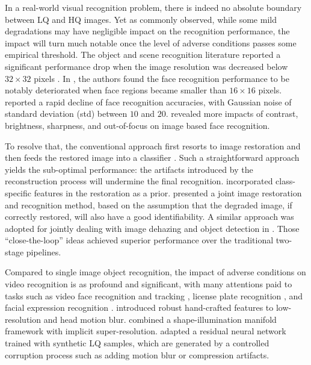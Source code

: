 \documentclass[10pt,twocolumn,twoside]{IEEEtran} %
\begin{document}
In a real-world visual recognition problem, there is indeed no absolute boundary between LQ and HQ images. Yet as commonly observed, while some mild degradations may have negligible impact on the recognition performance, the impact will turn much notable once the level of adverse conditions passes some empirical threshold. The object and scene recognition literature reported a significant performance drop when the image resolution was decreased below $32 \times 32$ pixels \cite{80tiny}. In \cite{VFR}, the authors found the face recognition performance to be notably deteriorated when face regions became smaller than $16 \times 16$ pixels. \cite{karahan2016image} reported a rapid decline of face recognition accuracies, with Gaussian noise of standard deviation (std) between $10$ and $20$. \cite{DVS12, ab14} revealed more impacts of contrast, brightness, sharpness, and out-of-focus on image based face recognition. 

To resolve that, the conventional approach first resorts to image restoration and then feeds the restored image into a classifier \cite{fergus2006removing,yang2010image,liu2017robust}. Such a straightforward approach yields the sub-optimal performance: the artifacts introduced by the reconstruction process will undermine the final recognition. \cite{VFR, cvpr08} incorporated class-specific features in the restoration as a prior. \cite{zhang2011close} presented a joint image restoration and recognition method, based on the assumption that the degraded image, if correctly restored, will also have a good identifiability.
A similar approach was adopted for jointly dealing with image dehazing and object detection in \cite{li2017aod}.
Those ``close-the-loop'' ideas achieved superior performance over the traditional two-stage pipelines. 

Compared to single image object recognition, the impact of adverse conditions on video recognition is as profound and significant, with many attentions paid to tasks such as video face recognition and tracking \cite{stasiak2009face}, license plate recognition \cite{chen2007license}, and facial expression recognition \cite{tian2004evaluation}. \cite{shan2005recognizing} introduced robust hand-crafted features to low-resolution and head motion blur. \cite{arandjelovic2007manifold} combined a shape-illumination manifold framework with implicit super-resolution. \cite{herrmann2016low} adapted a residual neural network trained with synthetic LQ samples, which are generated by a controlled corruption process such as adding motion blur or compression artifacts. 
\end{document}
